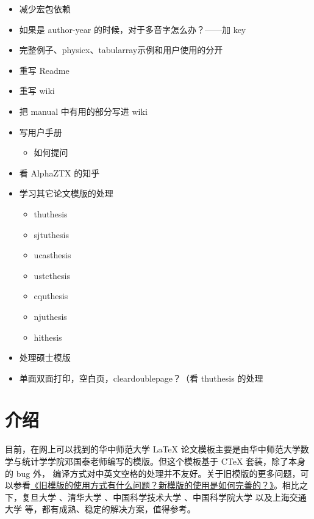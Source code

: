 \documentclass{ccnudoc}
\begin{document}
\begin{itemize}
  \item 减少宏包依赖
  \item 如果是 author-year 的时候，对于多音字怎么办？——加 key
  \item 完整例子、physicx、tabularray示例和用户使用的分开
  \item 重写 Readme
  \item 重写 wiki
  \item 把 manual 中有用的部分写进 wiki
  \item 写用户手册
    \begin{itemize}
      \item 如何提问
    \end{itemize}
  \item 看 AlphaZTX 的知乎
  \item 学习其它论文模版的处理
    \begin{itemize}
      \item thuthesis
      \item sjtuthesis
      \item ucasthesis
      \item ustcthesis
      \item cquthesis
      \item njuthesis
      \item hithesis
    \end{itemize}
  \item 处理硕士模版
  \item 单面双面打印，空白页，cleardoublepage？（看 thuthesis 的处理
\end{itemize}



\section{介绍}

目前，在网上可以找到的华中师范大学 \LaTeX{} 论文模板主要是由华中师范大学数学与统计学学院邓国泰老师编写的模版。但这个模板基于 CTeX 套装，除了本身的 bug 外， 编译方式对中英文空格的处理并不友好。关于旧模版的更多问题，可以参看\href{https://gitee.com/xkwxdyy/CCNUthesis/wikis/%E5%B8%B8%E8%A7%81%E9%97%AE%E9%A2%98FAQ/%E6%97%A7%E6%A8%A1%E7%89%88%E7%9A%84%E4%BD%BF%E7%94%A8%E6%96%B9%E5%BC%8F%E6%9C%89%E4%BB%80%E4%B9%88%E9%97%AE%E9%A2%98%EF%BC%9F%E6%96%B0%E6%A8%A1%E7%89%88%E7%9A%84%E4%BD%BF%E7%94%A8%E6%98%AF%E5%A6%82%E4%BD%95%E5%AE%8C%E5%96%84%E7%9A%84%EF%BC%9F}{《旧模版的使用方式有什么问题？新模版的使用是如何完善的？》}。相比之下，复旦大学 、清华大学 、中国科学技术大学 、中国科学院大学  以及上海交通大学 等，都有成熟、稳定的解决方案，值得参考。
\end{document}
